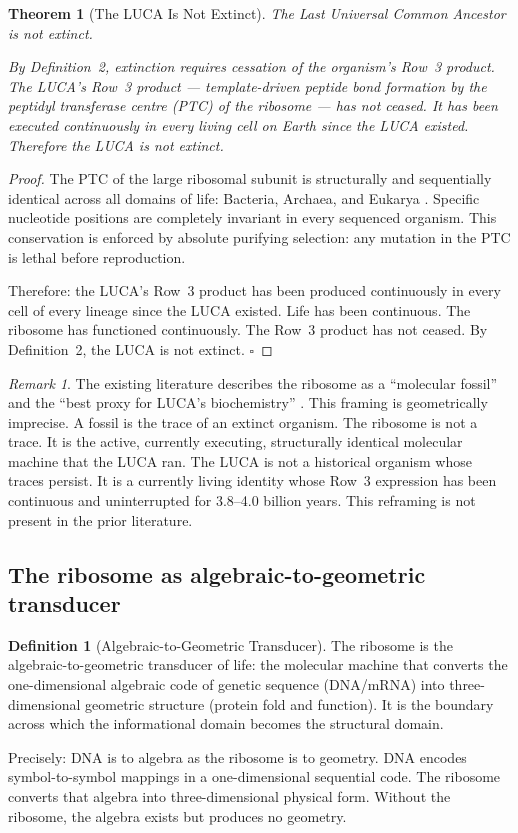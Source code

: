 \documentclass[12pt, a4paper]{article}
\newtheorem{theorem}{Theorem}[section]
\theoremstyle{definition}
\newtheorem{definition}{Definition}[section]
\theoremstyle{remark}
\newtheorem{remark}{Remark}[section]
\begin{document}
\begin{theorem}[The LUCA Is Not Extinct]
The Last Universal Common Ancestor is not extinct.

By Definition~2, extinction requires cessation of the
organism's Row~3 product. The LUCA's Row~3 product ---
template-driven peptide bond formation by the peptidyl
transferase centre (PTC) of the ribosome --- has not
ceased. It has been executed continuously in every living
cell on Earth since the LUCA existed. Therefore the LUCA
is not extinct.
\end{theorem}

\begin{proof}
The PTC of the large ribosomal subunit is structurally and
sequentially identical across all domains of life: Bacteria,
Archaea, and Eukarya \cite{ptc2022, ptc2020, luca2024}.
Specific nucleotide positions are completely invariant in
every sequenced organism. This conservation is enforced by
absolute purifying selection: any mutation in the PTC is
lethal before reproduction.

Therefore: the LUCA's Row~3 product has been produced
continuously in every cell of every lineage since the LUCA
existed. Life has been continuous. The ribosome has
functioned continuously. The Row~3 product has not ceased.
By Definition~2, the LUCA is not extinct. $\square$
\end{proof}

\begin{remark}
The existing literature describes the ribosome as a
``molecular fossil'' and the ``best proxy for LUCA's
biochemistry'' \cite{ptc2022}. This framing is geometrically
imprecise. A fossil is the trace of an extinct organism. The
ribosome is not a trace. It is the active, currently
executing, structurally identical molecular machine that the
LUCA ran. The LUCA is not a historical organism whose traces
persist. It is a currently living identity whose Row~3
expression has been continuous and uninterrupted for
3.8--4.0 billion years. This reframing is not present in
the prior literature.
\end{remark}

\subsection{The ribosome as algebraic-to-geometric transducer}

\begin{definition}[Algebraic-to-Geometric Transducer]
The ribosome is the algebraic-to-geometric transducer of
life: the molecular machine that converts the
one-dimensional algebraic code of genetic sequence
(DNA/mRNA) into three-dimensional geometric structure
(protein fold and function). It is the boundary across
which the informational domain becomes the structural
domain.

Precisely: DNA is to algebra as the ribosome is to geometry.
DNA encodes symbol-to-symbol mappings in a one-dimensional
sequential code. The ribosome converts that algebra into
three-dimensional physical form. Without the ribosome, the
algebra exists but produces no geometry.
\end{definition}
\end{document}
